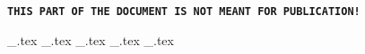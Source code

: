 \newpage
\pagestyle{emptycomplete}

\begin{pcenter*}
    \Huge\textbf{\texttt{THIS PART OF THE DOCUMENT IS NOT MEANT FOR PUBLICATION!}}
\end{pcenter*}

\newpage

{_.tex}
{_.tex}
{_.tex}
{_.tex}
{_.tex}
